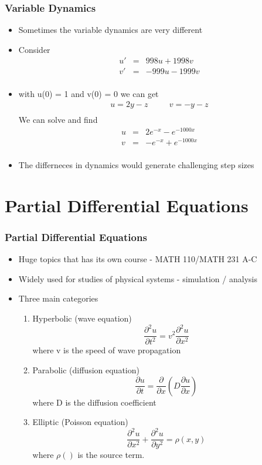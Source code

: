 \documentclass[10pt]{beamer}
\begin{document}
\begin{frame}
  \frametitle{Variable Dynamics}
  \begin{itemize}
  \item Sometimes the variable dynamics are very different
  \item Consider
    \[
      \begin{array}{rcl}
        u' & = & 998 u + 1998 v\\
        v' & = & -999u - 1999 v\\
      \end{array}
    \]
  \item with u(0) = 1 and v(0) = 0 we can get
    \[
      \begin{array}{rcl}
        u = 2 y - z & \mbox{~~~}& v = -y -z \\
      \end{array}
    \]
    We can solve and find
    \[
      \begin{array}{rcl}
        u & = & 2 e^{-x} - e^{-1000x}\\
        v & = & - e^{-x} + e^{-1000x}\\
      \end{array}
    \]
  \item The differneces in dynamics would generate challenging step sizes
  \end{itemize}
\end{frame}

\section{Partial Differential Equations}
\label{sec:part-diff-equat}

\begin{frame}
  \frametitle{Partial Differential Equations}
  \begin{itemize}
  \item Huge topics that has its own course - MATH 110/MATH 231 A-C
  \item Widely used for studies of physical systems - simulation / analysis
  \item Three main categories
    \begin{enumerate}
    \item Hyperbolic (wave equation)
      \[
        \frac{\partial^2 u}{\partial t^2} = v^2 \frac{\partial^2 u}{\partial x^2}
      \] where v is the speed of wave propagation
    \item Parabolic (diffusion equation)
      \[
        \frac{\partial u}{\partial t} = \frac{\partial}{\partial x}\left( D \frac{\partial  u}{\partial x} \right)
      \]
      where D is the diffusion coefficient
    \item Elliptic (Poisson equation)
      \[
        \frac{\partial^2 u }{\partial x^2} +  \frac{\partial^2 u }{\partial y^2} = \rho(x,y)
      \]
      where $\rho()$ is the source term. 
    \end{enumerate}
  \end{itemize}
\end{frame}
\end{document}
